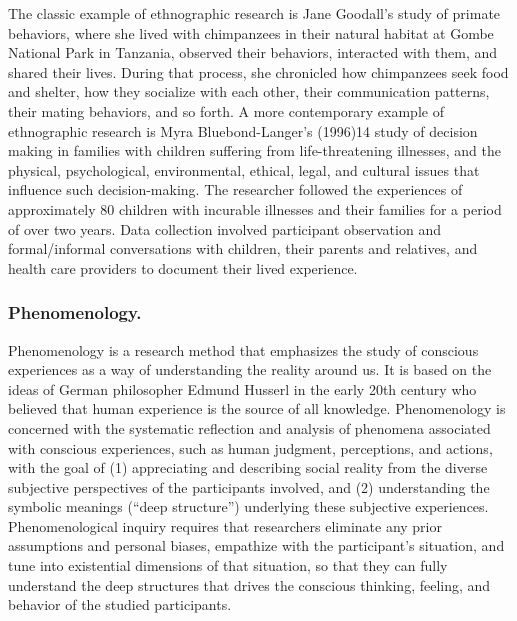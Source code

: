 The classic example of ethnographic research is Jane Goodall's study of primate behaviors, where she lived with chimpanzees in their natural habitat at Gombe National Park in Tanzania, observed their behaviors, interacted with them, and shared their lives. During that process, she chronicled how chimpanzees seek food and shelter, how they socialize with each other, their communication patterns, their mating behaviors, and so forth. A more contemporary example of ethnographic research is Myra Bluebond-Langer's (1996)14 study of decision making in families with children suffering from life-threatening illnesses, and the physical, psychological, environmental, ethical, legal, and cultural issues that influence such decision-making. The researcher followed the experiences of approximately 80 children with incurable illnesses and their families for a period of over two years. Data collection involved participant observation and formal/informal conversations with children, their parents and relatives, and health care providers to document their lived experience.


\subsubsection{Phenomenology.} Phenomenology is a research method that emphasizes the study of conscious experiences as a way of understanding the reality around us. It is based on the ideas of German philosopher Edmund Husserl in the early 20th century who believed that human experience is the source of all knowledge. Phenomenology is concerned with the systematic reflection and analysis of phenomena associated with conscious experiences, such as human judgment, perceptions, and actions, with the goal of (1) appreciating and describing social reality from the diverse subjective perspectives of the participants involved, and (2) understanding the symbolic meanings (``deep structure'') underlying these subjective experiences. Phenomenological inquiry requires that researchers eliminate any prior assumptions and personal biases, empathize with the participant's situation, and tune into existential dimensions of that situation, so that they can fully understand the deep structures that drives the conscious thinking, feeling, and behavior of the studied participants.

